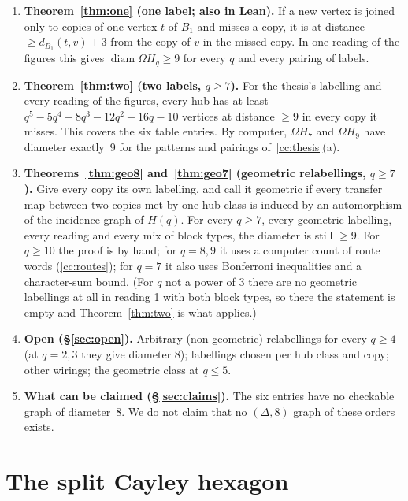 \documentclass[11pt]{amsart}
\theoremstyle{plain}
\theoremstyle{definition}
\theoremstyle{remark}
\newcommand{\Om}{\Omega}
\begin{document}
\begin{enumerate}[leftmargin=1.5em]
\item \textbf{Theorem~\ref{thm:one} (one label; also in Lean).} If a new vertex is joined only to copies of one vertex $t$
  of $B_1$ and misses a copy, it is at distance $\ge d_{B_1}(t,v) + 3$ from the copy of $v$ in the missed copy. In one
  reading of the figures this gives $\operatorname{diam} \Om H_q \ge 9$ for every $q$ and every pairing of labels.
\item \textbf{Theorem~\ref{thm:two} (two labels, $q \ge 7$).} For the thesis's labelling and every reading of the
  figures, every hub has at least $q^5 - 5q^4 - 8q^3 - 12q^2 - 16q - 10$ vertices at distance $\ge 9$ in every copy it
  misses. This covers the six table entries. By computer, $\Om H_7$ and $\Om H_9$ have diameter exactly~$9$ for the
  patterns and pairings of~\ref{cc:thesis}(a).
\item \textbf{Theorems~\ref{thm:geo8} and~\ref{thm:geo7} (geometric relabellings, $q \ge 7$).} Give every copy its own
  labelling, and call it geometric if every transfer map between two copies met by one hub class is induced by an
  automorphism of the incidence graph of $H(q)$. For every $q \ge 7$, every geometric labelling, every reading and every
  mix of block types, the diameter is still $\ge 9$. For $q \ge 10$ the proof is by hand; for $q = 8, 9$ it uses a
  computer count of route words (\ref{cc:routes}); for $q = 7$ it also uses Bonferroni inequalities and a
  character-sum bound. (For $q$ not a power of $3$ there are no geometric labellings at all in reading 1 with both block
  types, so there the statement is empty and Theorem~\ref{thm:two} is what applies.)
\item \textbf{Open (\S\ref{sec:open}).} Arbitrary (non-geometric) relabellings for every $q \ge 4$ (at $q = 2, 3$ they
  give diameter $8$); labellings chosen per hub class and copy; other wirings; the geometric class at $q \le 5$.
\item \textbf{What can be claimed (\S\ref{sec:claims}).} The six entries have no checkable graph of diameter~$8$. We do
  not claim that no $(\Delta, 8)$ graph of these orders exists.
\end{enumerate}

\section{The split Cayley hexagon}\label{sec:hexagon}
\end{document}
